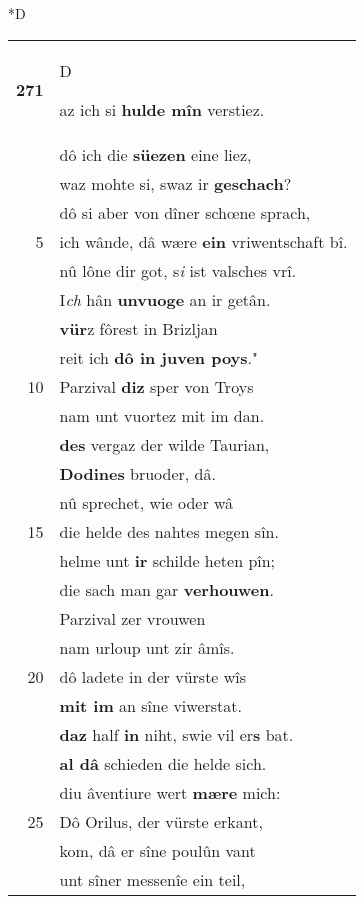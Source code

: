 \documentclass[8pt,a4paper,notitlepage]{article}
\begin{document}
\begin{table}[ht]
\begin{minipage}[t]{0.5\linewidth}
\small
\begin{center}*D
\end{center}
\begin{tabular}{rl}
\textbf{271} & \begin{large}D\end{large}az ich si \textbf{hulde mîn} verstiez.\\ 
 & dô ich die \textbf{süezen} eine liez,\\ 
 & waz mohte si, swaz ir \textbf{geschach}?\\ 
 & dô si aber von dîner schœne sprach,\\ 
5 & ich wânde, dâ wære \textbf{ein} vriwentschaft bî.\\ 
 & nû lône dir got, s\textit{i} ist valsches vrî.\\ 
 & I\textit{ch} hân \textbf{unvuoge} an ir getân.\\ 
 & \textbf{vür}z fôrest in Brizljan\\ 
 & reit ich \textbf{dô in juven poys}."\\ 
10 & Parzival \textbf{diz} sper von Troys\\ 
 & nam unt vuortez mit im dan.\\ 
 & \textbf{des} vergaz der wilde Taurian,\\ 
 & \textbf{Dodines} bruoder, dâ.\\ 
 & nû sprechet, wie oder wâ\\ 
15 & die helde des nahtes megen sîn.\\ 
 & helme unt \textbf{ir} schilde heten pîn;\\ 
 & die sach man gar \textbf{verhouwen}.\\ 
 & Parzival zer vrouwen\\ 
 & nam urloup unt zir âmîs.\\ 
20 & dô ladete in der vürste wîs\\ 
 & \textbf{mit im} an sîne viwerstat.\\ 
 & \textbf{daz} half \textbf{in} niht, swie vil er\textbf{s} bat.\\ 
 & \textbf{al dâ} schieden die helde sich.\\ 
 & diu âventiure wert \textbf{mære} mich:\\ 
25 & Dô Orilus, der vürste erkant,\\ 
 & kom, dâ er sîne poulûn vant\\ 
 & unt sîner messenîe ein teil,\\ 

\end{tabular}
\end{minipage}
\end{table}
\end{document}
